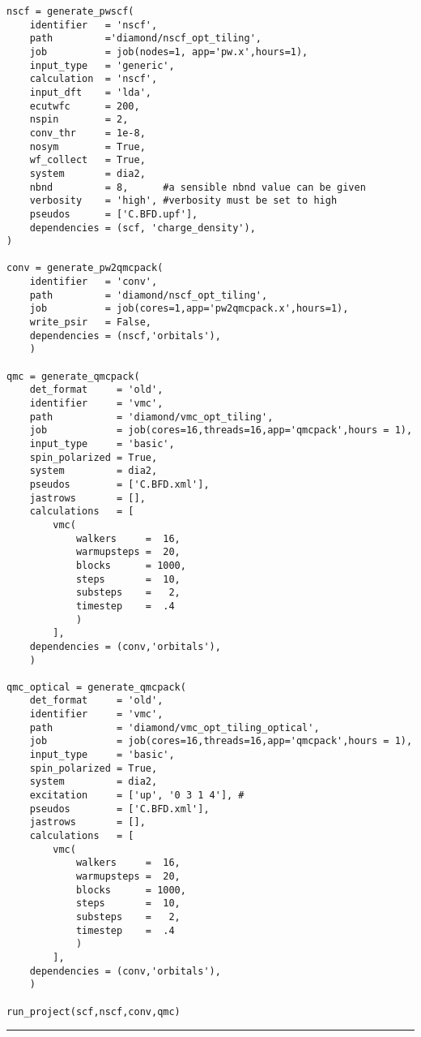 \documentclass[oneside,11pt]{memoir}
\numberwithin{equation}{section}
\newcommand{\HRule}{\rule{\linewidth}{0.5mm}}
\begin{document}
\begin{verbatim}
nscf = generate_pwscf(
    identifier   = 'nscf',
    path         ='diamond/nscf_opt_tiling',
    job          = job(nodes=1, app='pw.x',hours=1),
    input_type   = 'generic',
    calculation  = 'nscf',
    input_dft    = 'lda',
    ecutwfc      = 200,
    nspin        = 2,
    conv_thr     = 1e-8,
    nosym        = True,
    wf_collect   = True,
    system       = dia2,
    nbnd         = 8,      #a sensible nbnd value can be given
    verbosity    = 'high', #verbosity must be set to high
    pseudos      = ['C.BFD.upf'],
    dependencies = (scf, 'charge_density'),
)

conv = generate_pw2qmcpack(
    identifier   = 'conv',
    path         = 'diamond/nscf_opt_tiling',
    job          = job(cores=1,app='pw2qmcpack.x',hours=1),
    write_psir   = False,
    dependencies = (nscf,'orbitals'),
    )

qmc = generate_qmcpack(
    det_format     = 'old',
    identifier     = 'vmc',
    path           = 'diamond/vmc_opt_tiling',
    job            = job(cores=16,threads=16,app='qmcpack',hours = 1),
    input_type     = 'basic',
    spin_polarized = True,
    system         = dia2,
    pseudos        = ['C.BFD.xml'],
    jastrows       = [],
    calculations   = [
        vmc(
            walkers     =  16,
            warmupsteps =  20,
            blocks      = 1000,
            steps       =  10,
            substeps    =   2,
            timestep    =  .4
            )
        ],
    dependencies = (conv,'orbitals'),
    )

qmc_optical = generate_qmcpack(
    det_format     = 'old',
    identifier     = 'vmc',
    path           = 'diamond/vmc_opt_tiling_optical',
    job            = job(cores=16,threads=16,app='qmcpack',hours = 1),
    input_type     = 'basic',
    spin_polarized = True,
    system         = dia2,
    excitation     = ['up', '0 3 1 4'], #
    pseudos        = ['C.BFD.xml'],
    jastrows       = [],
    calculations   = [
        vmc(
            walkers     =  16,
            warmupsteps =  20,
            blocks      = 1000,
            steps       =  10,
            substeps    =   2,
            timestep    =  .4
            )
        ],
    dependencies = (conv,'orbitals'),
    )

run_project(scf,nscf,conv,qmc)

\end{verbatim}
\HRule
\end{document}
